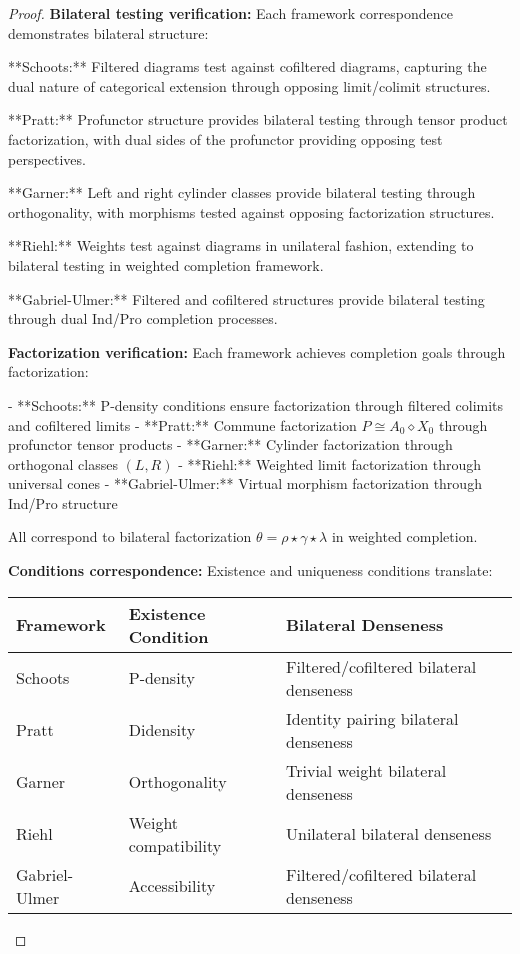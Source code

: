 \documentclass[11pt]{article}
\theoremstyle{plain}
\theoremstyle{definition}
\theoremstyle{remark}
\begin{document}
\begin{proof}
\textbf{Bilateral testing verification:} Each framework correspondence demonstrates bilateral structure:

**Schoots:** Filtered diagrams test against cofiltered diagrams, capturing the dual nature of categorical extension through opposing limit/colimit structures.

**Pratt:** Profunctor structure provides bilateral testing through tensor product factorization, with dual sides of the profunctor providing opposing test perspectives.

**Garner:** Left and right cylinder classes provide bilateral testing through orthogonality, with morphisms tested against opposing factorization structures.

**Riehl:** Weights test against diagrams in unilateral fashion, extending to bilateral testing in weighted completion framework.

**Gabriel-Ulmer:** Filtered and cofiltered structures provide bilateral testing through dual Ind/Pro completion processes.

\textbf{Factorization verification:} Each framework achieves completion goals through factorization:

- **Schoots:** P-density conditions ensure factorization through filtered colimits and cofiltered limits
- **Pratt:** Commune factorization $P \cong A_0 \diamond X_0$ through profunctor tensor products
- **Garner:** Cylinder factorization through orthogonal classes $(L, R)$
- **Riehl:** Weighted limit factorization through universal cones
- **Gabriel-Ulmer:** Virtual morphism factorization through Ind/Pro structure

All correspond to bilateral factorization $\theta = \rho \star \gamma \star \lambda$ in weighted completion.

\textbf{Conditions correspondence:} Existence and uniqueness conditions translate:

\begin{center}
\begin{tabular}{|l|l|l|}
\hline
\textbf{Framework} & \textbf{Existence Condition} & \textbf{Bilateral Denseness} \\
\hline
Schoots & P-density & Filtered/cofiltered bilateral denseness \\
Pratt & Didensity & Identity pairing bilateral denseness \\
Garner & Orthogonality & Trivial weight bilateral denseness \\
Riehl & Weight compatibility & Unilateral bilateral denseness \\
Gabriel-Ulmer & Accessibility & Filtered/cofiltered bilateral denseness \\
\hline
\end{tabular}
\end{center}


\end{proof}
\end{document}
